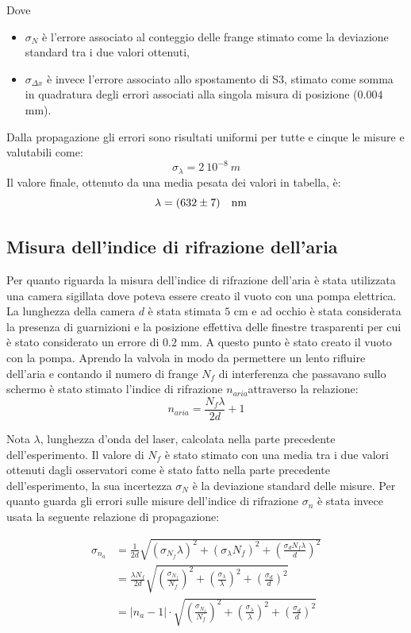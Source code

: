 \documentclass{article}
\begin{document}
    Dove
    \begin{itemize}
        \item $\sigma_N$ è l'errore associato al conteggio delle frange stimato come la deviazione standard tra i due valori ottenuti,
        \item  $\sigma_{\Delta x}$ è invece l'errore associato allo spostamento di S3, stimato come somma in quadratura degli errori associati alla singola misura di posizione ($0.004$ mm).
    \end{itemize}
    
    Dalla propagazione gli errori sono risultati uniformi per tutte e cinque le misure e valutabili come: 
        \[\sigma_{\lambda}= 2\ 10^{-8}\ m\]
    Il valore finale, ottenuto da una media pesata dei valori in tabella, è: 
        \[\lambda = (632 \pm 7) \qq{nm}\]

    \subsection{Misura dell'indice di rifrazione dell'aria}
    
        Per quanto riguarda la misura dell'indice di rifrazione dell'aria è stata utilizzata una camera sigillata dove poteva essere creato il vuoto con una pompa elettrica. La lunghezza della camera $d$ è stata stimata $5$ cm e ad occhio è stata considerata la presenza di guarnizioni e la posizione effettiva delle finestre trasparenti per cui è stato considerato un errore di $0.2$ mm. A questo punto è stato creato il vuoto con la pompa. Aprendo la valvola in modo da permettere un lento rifluire dell'aria e contando il numero di frange $N_f$ di interferenza che passavano sullo schermo è stato stimato l'indice di rifrazione $n_{aria} $attraverso la relazione:
             \[n_{aria}  = \frac{N_f\lambda}{2d}+1\]

        Nota $\lambda$, lunghezza d'onda del laser, calcolata nella parte precedente dell'esperimento. Il valore di $N_f$ è stato stimato con una media tra i due valori ottenuti dagli osservatori come è stato fatto nella parte precedente dell'esperimento, la sua incertezza $\sigma_N$ è la deviazione standard delle misure.  Per quanto guarda gli errori sulle misure dell'indice di rifrazione $\sigma_n$ è stata invece usata la seguente relazione di propagazione:

        \begin{align*}
            \sigma_{n_a} &= \frac{1}{2d} \sqrt{(\sigma_{N_f} \lambda)^2+(\sigma_{\lambda} N_f)^2+(\frac{\sigma_d N_f \lambda}{d} )^2 }\\
            &= \frac{\lambda N_f}{2d} \sqrt{(\frac{\sigma_{N_f}}{N_f} )^2+(\frac{\sigma_{\lambda}}{\lambda})^2+(\frac{\sigma_d}{d} )^2 }\\
            &=|n_a -1 | \cdot \sqrt{(\frac{\sigma_{N_f}}{N_f} )^2+(\frac{\sigma_{\lambda}}{\lambda})^2+(\frac{\sigma_d}{d} )^2 }
        \end{align*}
          
\end{document}
